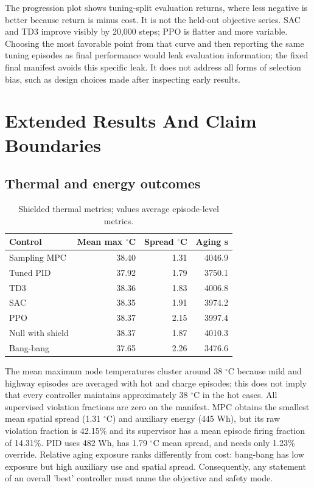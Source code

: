 \documentclass[conference]{IEEEtran}
\begin{document}
The progression plot shows tuning-split evaluation returns, where less negative is better because return is minus cost. It is not the held-out objective series. SAC and TD3 improve visibly by 20,000 steps; PPO is flatter and more variable. Choosing the most favorable point from that curve and then reporting the same tuning episodes as final performance would leak evaluation information; the fixed final manifest avoids this specific leak. It does not address all forms of selection bias, such as design choices made after inspecting early results.

\section{Extended Results And Claim Boundaries}
\subsection{Thermal and energy outcomes}
\begin{table}[t]
\caption{Shielded thermal metrics; values average episode-level metrics.}
\label{tab:IX}
\centering\footnotesize
\begin{tabular}{lrrr}
\toprule
Control & Mean max $^{\circ}$C & Spread $^{\circ}$C & Aging s\\
\midrule
Sampling MPC & 38.40 & 1.31 & 4046.9\\
Tuned PID & 37.92 & 1.79 & 3750.1\\
TD3 & 38.36 & 1.83 & 4006.8\\
SAC & 38.35 & 1.91 & 3974.2\\
PPO & 38.37 & 2.15 & 3997.4\\
Null with shield & 38.37 & 1.87 & 4010.3\\
Bang-bang & 37.65 & 2.26 & 3476.6\\
\bottomrule
\end{tabular}
\end{table}
The mean maximum node temperatures cluster around 38 $^{\circ}$C because mild and highway episodes are averaged with hot and charge episodes; this does not imply that every controller maintains approximately 38 $^{\circ}$C in the hot cases. All supervised violation fractions are zero on the manifest. MPC obtains the smallest mean spatial spread (1.31 $^{\circ}$C) and auxiliary energy (445 Wh), but its raw violation fraction is 42.15\% and its supervisor has a mean episode firing fraction of 14.31\%. PID uses 482 Wh, has 1.79 $^{\circ}$C mean spread, and needs only 1.23\% override. Relative aging exposure ranks differently from cost: bang-bang has low exposure but high auxiliary use and spatial spread. Consequently, any statement of an overall 'best' controller must name the objective and safety mode.
\end{document}
